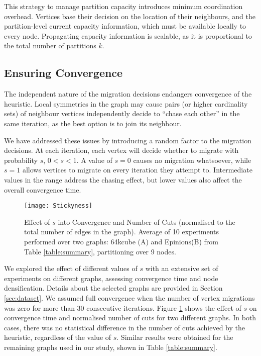 \documentclass{sig-alternate-10pt}
\begin{document}
This strategy to manage partition capacity introduces minimum coordination overhead. Vertices base their decision on the location of their neighbours, and the partition-level current capacity information, which must be available locally to every node. Propagating capacity information is scalable, as it is proportional to the total number of partitions $k$.


\subsection{Ensuring Convergence} 

The independent nature of the migration decisions endangers convergence of the heuristic. Local symmetries in the graph may cause pairs (or higher cardinality sets) of neighbour vertices independently decide to ``chase each other'' in the same iteration, as the best option is to join its neighbour. 

We have addressed these issues by introducing a random factor to the migration decisions. At each iteration, each vertex will decide whether to migrate with probability $s$, $0 < s < 1$. A value of $s=0$ causes no migration whatsoever, while $s=1$ allows vertices to migrate on every iteration they attempt to. Intermediate values in the range address the chasing effect, but lower values also affect the overall convergence time.

\begin{figure}
  \centering
    \texttt{[image: Stickyness]}
  \caption{Effect of $s$ into Convergence and Number of Cuts (normalised to the total number of edges in the graph). Average of 10 experiments performed over two graphs: 64kcube (A) and Epinions(B) from Table \ref{table:summary}, partitioning over 9 nodes.}
    \vspace{-10pt}
  \label{fig:convergence}
\end{figure}

We explored the effect of different values of $s$ with an extensive set of experiments on different graphs, assessing convergence time and node densification. Details about the selected graphs are provided in Section \ref{sec:dataset}. We assumed full convergence when the number of vertex migrations was zero for more than 30 consecutive iterations. Figure \ref{fig:convergence} shows the effect of $s$ on convergence time and normalised number of cuts for two different graphs. In both cases, there was no statistical difference in the number of cuts achieved by the heuristic, regardless of the value of $s$. Similar results were obtained for the remaining graphs used in our study, shown in Table \ref{table:summary}.
\end{document}
